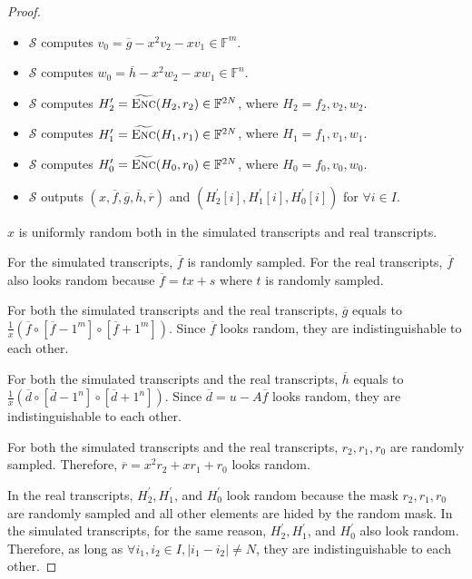 \begin{proof}
\begin{itemize}
    \item $\mathcal{S}$ computes $v_0 = \overline{g} - x^2 v_2 - x v_1 \in \mathbb{F}^m$.

    \item $\mathcal{S}$ computes $w_0 = \overline{h} - x^2 w_2 - x w_1 \in \mathbb{F}^n$.  
    
    \item $\mathcal{S}$ computes $H_2^\prime = \widetilde{\textsc{Enc}}(H_2, r_2) \in \mathbb{F}^{2N}$, where $H_2 = f_2, v_2, w_2$.

    \item $\mathcal{S}$ computes $H_1^\prime = \widetilde{\textsc{Enc}}(H_1, r_1) \in \mathbb{F}^{2N}$, where $H_1 = f_1, v_1, w_1$.

    \item $\mathcal{S}$ computes $H_0^\prime = \widetilde{\textsc{Enc}}(H_0, r_0) \in \mathbb{F}^{2N}$, where $H_0 = f_0, v_0, w_0$.
    
    \item $\mathcal{S}$ outputs $(x, \overline{f}, \overline{g}, \overline{h}, \overline{r})$ and $(H_2^\prime[i], H_1^\prime[i], H_0^\prime[i])$ for $\forall i \in I$.
\end{itemize}

$x$ is uniformly random both in the simulated transcripts and real transcripts. 

For the simulated transcripts, $\overline{f}$ is randomly sampled. For the real transcripts, $\overline{f}$ also looks random because $\overline{f} = tx + s$ where $t$ is randomly sampled.

For both the simulated transcripts and the real transcripts, $\overline{g}$ equals to $\frac{1}{x} (\overline{f} \circ [\overline{f} - 1^m] \circ [\overline{f} + 1^m])$. Since $\overline{f}$ looks random, they are indistinguishable to each other.

For both the simulated transcripts and the real transcripts, $\overline{h}$ equals to $\frac{1}{x} (\overline{d} \circ [\overline{d} - 1^n] \circ [\overline{d} + 1^n])$. Since $\overline{d} = u - A\overline{f}$ looks random, they are indistinguishable to each other.

For both the simulated transcripts and the real transcripts, $r_2, r_1, r_0$ are randomly sampled. Therefore, $\overline{r} = x^2 r_2 + x r_1 + r_0$ looks random.

In the real transcripts, $H_2^\prime, H_1^\prime$, and $H_0^\prime$ look random because the mask $r_2, r_1, r_0$ are randomly sampled and all other elements are hided by the random mask. In the simulated transcripts, for the same reason, $H_2^\prime, H_1^\prime$, and $H_0^\prime$ also look random. Therefore, as long as $\forall i_1, i_2 \in I, |i_1 - i_2| \neq N$, they are indistinguishable to each other.

\end{proof}


